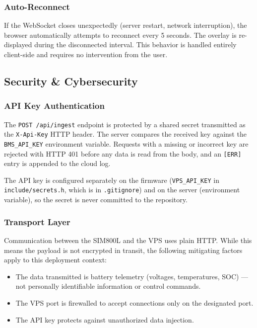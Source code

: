\subsubsection{Auto-Reconnect}

If the WebSocket closes unexpectedly (server restart, network interruption), the browser automatically attempts to reconnect every 5 seconds. The overlay is re-displayed during the disconnected interval. This behavior is handled entirely client-side and requires no intervention from the user.

\subsection{Security \& Cybersecurity}

\subsubsection{API Key Authentication}

The \texttt{POST /api/ingest} endpoint is protected by a shared secret transmitted as the \texttt{X-Api-Key} HTTP header. The server compares the received key against the \texttt{BMS\_API\_KEY} environment variable. Requests with a missing or incorrect key are rejected with HTTP 401 before any data is read from the body, and an \texttt{[ERR]} entry is appended to the cloud log.

The API key is configured separately on the firmware (\texttt{VPS\_API\_KEY} in \texttt{include/secrets.h}, which is in \texttt{.gitignore}) and on the server (environment variable), so the secret is never committed to the repository.

\subsubsection{Transport Layer}

Communication between the SIM800L and the VPS uses plain HTTP. While this means the payload is not encrypted in transit, the following mitigating factors apply to this deployment context:

\begin{itemize}
    \item The data transmitted is battery telemetry (voltages, temperatures, SOC) — not personally identifiable information or control commands.
    \item The VPS port is firewalled to accept connections only on the designated port.
    \item The API key protects against unauthorized data injection.
\end{itemize}


